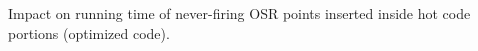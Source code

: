 \label{fig:code-quality-O1} Impact on running time of never-firing OSR points inserted inside hot code portions (optimized code).
  
  
  
